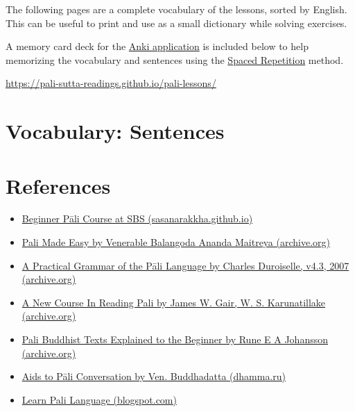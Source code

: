\documentclass[11pt,oneside]{memoir}
\begin{document}
The following pages are a complete vocabulary of the lessons, sorted by English. This can be useful to print and use as a small dictionary while solving exercises.

A memory card deck for the \href{https://apps.ankiweb.net/}{Anki application} is included below to help memorizing the vocabulary and sentences using the \href{https://gwern.net/spaced-repetition}{Spaced Repetition} method.

\url{https://pali-sutta-readings.github.io/pali-lessons/}

\cleartonewsheet

\thispagestyle{empty}


\cleartonewsheet
\chapter{Vocabulary: Sentences}
\label{sec:org55ced06}

\cleartonewsheet

\thispagestyle{empty}


\cleartonewsheet
\chapter{References}
\label{sec:orgaf501ea}

\begin{itemize}
\item \href{https://sasanarakkha.github.io/study-tools/pali-class.html}{Beginner Pāli Course at SBS (sasanarakkha.github.io)}
\item \href{https://archive.org/details/PaliMadeEasyOCRed}{Pali Made Easy by Venerable Balangoda Ananda Maitreya (archive.org)}
\item \href{https://archive.org/details/PaliGrammarCharlesDuroiselle}{A Practical Grammar of the Pāli Language by Charles Duroiselle, v4.3, 2007 (archive.org)}
\item \href{https://archive.org/details/NewPaliCourse/}{A New Course In Reading Pali by James W. Gair, W. S. Karunatillake (archive.org)}
\item \href{https://archive.org/details/PaliBuddhistTextsA}{Pali Buddhist Texts Explained to the Beginner by Rune E A Johansson (archive.org)}
\item \href{https://dhamma.ru/paali/aids\_to\_pali\_conversation.pdf}{Aids to Pāli Conversation by Ven. Buddhadatta (dhamma.ru)}
\item \href{https://palistudies.blogspot.com/}{Learn Pali Language (blogspot.com)}
\end{itemize}
\end{document}
